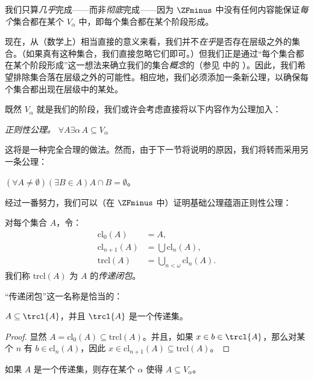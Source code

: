 \documentclass[../../../include/open-logic-section]{subfiles}
\begin{document}


我们只算\emph{几乎}完成——而非\emph{彻底}完成——因为 $\ZFminus$ 中没有任何内容能保证\emph{每个}集合都在某个 $V_\alpha$ 中，即每个集合都在某个阶段形成。

现在，从（数学上）相当直接的意义来看，我们并不\emph{在乎}是否存在层级之外的集合。（如果真有这种集合，我们直接忽略它们即可。）但我们正是通过“每个集合都在某个阶段形成”这一想法来确立我们的集合\emph{概念}的（参见  中的 \stageshier{}）。因此，我们希望排除集合落在层级之外的可能性。相应地，我们必须添加一条新公理，以确保每个集合都出现在层级中的某处。

既然 $V_\alpha$ 就是我们的阶段，我们或许会考虑直接将以下内容作为公理加入：

\begin{defish}
\emph{正则性公理。} $\forall A \exists \alpha\, A \subseteq V_\alpha$
\end{defish}

这将是一种完全合理的做法。然而，由于下一节将说明的原因，我们将转而采用另一条公理：

\begin{axiom}[基础公理]
$(\forall A \neq \emptyset)(\exists B \in A)A \cap B = \emptyset$。
\end{axiom}

经过一番努力，我们可以（在 $\ZFminus$ 中）证明基础公理蕴涵正则性公理：
\begin{defn}
对每个集合 $A$，令：
\begin{align*}
	\text{cl}_0(A) &= A,\\
	\text{cl}_{n+1}(A) &= \bigcup \text{cl}_n(A),\\
	\text{trcl}(A) &= \bigcup_{n < \omega} \text{cl}_{n}(A).
\end{align*}
我们称 $\text{trcl}(A)$ 为 $A$ 的\emph{传递闭包}。
\end{defn}
\noindent
“传递闭包”这一名称是恰当的：
\begin{prop}
$A \subseteq \trcl{A}$，并且 $\trcl{A}$ 是一个传递集。
\end{prop}

\begin{proof}
显然 $A = \text{cl}_0(A) \subseteq \text{trcl}(A)$。并且，如果 $x \in b \in \trcl{A}$，那么对某个 $n$ 有 $b \in \text{cl}_n(A)$，因此 $x
\in \text{cl}_{n+1}(A) \subseteq \text{trcl}(A)$。
\end{proof}

\begin{lem}
如果 $A$ 是一个传递集，则存在某个 $\alpha$ 使得 $A \subseteq V_\alpha$。
\end{lem}
\end{document}
